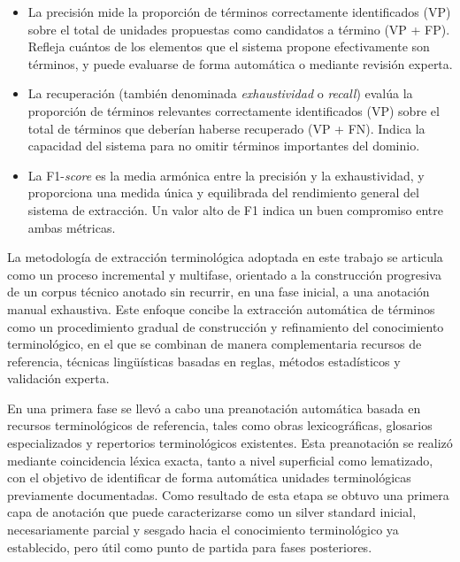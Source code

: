 \begin{itemize}
    \item La precisión mide la proporción de términos correctamente identificados (VP) sobre el total de unidades propuestas como candidatos a término (VP + FP). Refleja cuántos de los elementos que el sistema propone efectivamente son términos, y puede evaluarse de forma automática o mediante revisión experta.

    \label{eq:precision}


    \item La recuperación (también denominada \textit{exhaustividad} o \textit{recall}) evalúa la proporción de términos relevantes correctamente identificados (VP) sobre el total de términos que deberían haberse recuperado (VP + FN). Indica la capacidad del sistema para no omitir términos importantes del dominio.

    \label{eq:recall}

    \item La F1-\textit{score} es la media armónica entre la precisión y la exhaustividad, y proporciona una medida única y equilibrada del rendimiento general del sistema de extracción. Un valor alto de F1 indica un buen compromiso entre ambas métricas.

    \label{eq:f1score}

\end{itemize}

La metodología de extracción terminológica adoptada en este trabajo se articula como un proceso incremental y multifase, orientado a la construcción progresiva de un corpus técnico anotado sin recurrir, en una fase inicial, a una anotación manual exhaustiva. Este enfoque concibe la extracción automática de términos como un procedimiento gradual de construcción y refinamiento del conocimiento terminológico, en el que se combinan de manera complementaria recursos de referencia, técnicas lingüísticas basadas en reglas, métodos estadísticos y validación experta.

En una primera fase se llevó a cabo una preanotación automática basada en recursos terminológicos de referencia, tales como obras lexicográficas, glosarios especializados y repertorios terminológicos existentes. Esta preanotación se realizó mediante coincidencia léxica exacta, tanto a nivel superficial como lematizado, con el objetivo de identificar de forma automática unidades terminológicas previamente documentadas. Como resultado de esta etapa se obtuvo una primera capa de anotación que puede caracterizarse como un silver standard inicial, necesariamente parcial y sesgado hacia el conocimiento terminológico ya establecido, pero útil como punto de partida para fases posteriores.

